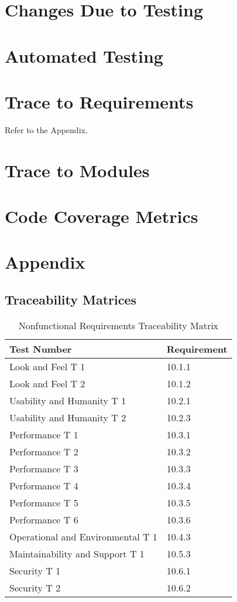\documentclass[12pt, titlepage]{article}
\begin{document}
\newpage

\section{Changes Due to Testing}

\section{Automated Testing}
		
\section{Trace to Requirements}
Refer to the Appendix.
		
\section{Trace to Modules}		

\section{Code Coverage Metrics}

\newpage
\section*{Appendix}
\subsection*{Traceability Matrices}
\begin{table}[H]
	\caption{Nonfunctional Requirements Traceability Matrix} \label{TraceMatrix2}
	\begin{tabular}{ll}
		\toprule
		\textbf{Test Number} & \textbf{Requirement} \\
		\midrule
		Look and Feel T 1 & 10.1.1\\
		Look and Feel T 2 & 10.1.2\\
		\midrule
		Usability and Humanity T 1 & 10.2.1\\
		Usability and Humanity T 2 & 10.2.3\\
		\midrule
		Performance T 1 & 10.3.1\\
		Performance T 2 & 10.3.2\\
		Performance T 3 & 10.3.3\\
		Performance T 4 & 10.3.4\\
		Performance T 5 & 10.3.5\\
		Performance T 6 & 10.3.6\\
		\midrule
		Operational and Environmental T 1 & 10.4.3\\
		\midrule
		Maintainability and Support T 1 & 10.5.3\\
		\midrule
		Security T 1 & 10.6.1\\
		Security T 2 & 10.6.2\\
		\bottomrule
	\end{tabular}
\end{table}
\end{document}
